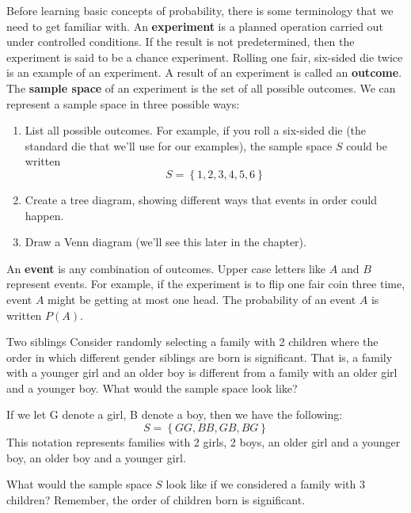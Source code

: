 \setcounter{ExampleCounter}{1}
Before learning basic concepts of probability, there is some terminology that we need to get familiar with. 
An \textbf{experiment} is a planned operation carried out under controlled conditions. If the result is not predetermined, then the
experiment is said to be a chance experiment. Rolling one fair, six-sided die twice is an example of an experiment.
A result of an experiment is called an \textbf{outcome}. The \textbf{sample space} of an experiment is the set of all possible outcomes.
We can represent a sample space in three possible ways: 
\begin{enumerate}
\item List all possible outcomes.  For example, if you roll a six-sided die (the standard die that we'll use for our examples), the sample space $S$ could be written \[S = \left\{1, 2, 3, 4, 5, 6 \right\}\]
\item Create a tree diagram, showing different ways that events in order could happen.
\item Draw a Venn diagram (we'll see this later in the chapter).
\end{enumerate}

An \textbf{event} is any combination of outcomes. Upper case letters like $A$ and $B$ represent events. For example, if the experiment
is to flip one fair coin three time, event $A$ might be getting at most one head. The probability of an event $A$ is written $P(A)$. 

\begin{example}[https://www.youtube.com/watch?v=dZda3xN2W_g&list=PLfmpjsIzhzts14-9s5QixRje97EI2oeMF&index=1]{Two siblings}
Consider randomly selecting a family with 2 children where the order in which different gender siblings are born is significant. That is, a family with a younger girl and an older boy is different from a family with an older girl and a younger boy. What would the sample space look like?

\sol
If we let G denote a girl, B denote a boy, then we have the following:
\[  S = \boxed{\left\{ GG, BB, GB, BG \right\}} \]
This notation represents families with 2 girls, 2 boys, an older girl and a younger boy, an older boy and a younger girl. 
\end{example}

\begin{try}
What would the sample space $S$ look like if we considered a family with 3 children? Remember, the order of children born is significant. 
\end{try}

